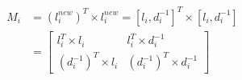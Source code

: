 \begin{comment}
\tiny 
\begin{gather}
M_i = \begin{bmatrix}
l_{i,0}*l_{i,0} & \dots & l_{i,0}*l_{i,L-1} & \frac{l_{i,0}}{d_{i,0}} & \dots & \frac{l_{i,0}}{d_{i,i-1}} & l_{i,0} & \frac{l_{i,0}}{d_{i,i+1}} & \dots & \frac{l_{i,0}}{d_{i,N-1}}\\
l_{i,1}*l_{i,0} & \dots & l_{i,1}*l_{i,L-1} & \frac{l_{i,1}}{d_{i,0}} & \dots & \frac{l_{i,1}}{d_{i,i-1}} & l_{i,1} & \frac{l_{i,1}}{d_{i,i+1}} & \dots & \frac{l_{i,1}}{d_{i,N-1}}\\
\vdots & \ddots & \vdots & \vdots & \ddots & \vdots & \vdots & \vdots & \ddots & \vdots\\
l_{i,L-1}*l_{i,0} & \dots & l_{i,L-1}*l_{i,L-1} & \frac{l_{i,L-1}}{d_{i,0}} & \dots & \frac{l_{i,L-1}}{d_{i,i-1}} & l_{i,L-1} & \frac{l_{i,L-1}}{d_{i,i+1}} & \dots & \frac{l_{i,L-1}}{d_{i,N-1}}\\
\frac{l_{i,0}}{d_{i,0}} & \dots & \frac{l_{i,L-1}}{d_{i,0}} & \frac{1}{d_{i,0}*d_{i,0}} & \dots & \frac{1}{d_{i,0}*d_{i,i-1}} & \frac{1}{d_{i,0}} & \frac{1}{d_{i,0}*d_{i,i+1}} & \dots & \frac{1}{d_{i,0}*d_{i,N-1}}\\
\vdots & \ddots & \vdots & \vdots & \ddots & \vdots & \vdots & \vdots & \ddots & \vdots\\
l_{i,0} & \dots & l_{i,L-1} & \frac{1}{d_{i,0}} & \dots & \frac{1}{d_{i,i-1}} & 1 & \frac{1}{d_{i,i+1}} & \dots & \frac{1}{d_{i,N-1}}\\
\vdots & \ddots & \vdots & \vdots & \ddots & \vdots & \vdots & \vdots & \ddots & \vdots\\
\frac{l_{i,0}}{d_{i,N-1}} & \dots & \frac{l_{i,L-1}}{d_{i,N-1}} & \frac{1}{d_{i,N-1}*d_{i,0}} & \dots & \frac{1}{d_{i,N-1}*d_{i,i-1}} & \frac{1}{d_{i,N-1}} & \frac{1}{d_{i,N-1}*d_{i,i+1}} & \dots & \frac{1}{d_{i,N-1}*d_{i,N-1}}
\end{bmatrix}
\end{gather}
\normalsize
\end{comment}


\begin{equation}
\begin{split}
M_i &= \left(l_i^{new}\right)^T \times l_i^{new}
=\left[ l_i,d_i^{-1} \right]^T \times \left[ l_i,d_i^{-1} \right]\\
&=\begin{bmatrix}
l_i^T \times l_i & l_i^T \times d_i^{-1}\\
\left(d_i^{-1}\right)^T \times l_i & \left(d_i^{-1}\right)^T \times d_i^{-1}
\end{bmatrix}
\end{split}
\label{eqn:iotmi}
\end{equation}

